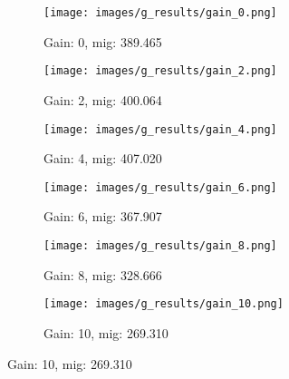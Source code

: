 \begin{figure}[h]
    \centering
    \begin{subfigure}[b]{0.4\textwidth}
        \centering
        \texttt{[image: images/g\_results/gain\_0.png]}
        \caption{Gain: 0, \gls{mig}: 389.465}
        \label{subfig:underexposed.png}
    \end{subfigure}
    \hspace{1cm}
    \begin{subfigure}[b]{0.4\textwidth}
        \centering
        \texttt{[image: images/g\_results/gain\_2.png]}
        \caption{Gain: 2, \gls{mig}: 400.064}
        \label{subfig:underexposed.png}
    \end{subfigure}

    \vspace{5mm}
    
    \begin{subfigure}[b]{0.4\textwidth}
        \centering
        \texttt{[image: images/g\_results/gain\_4.png]}
        \caption{Gain: 4, \gls{mig}: 407.020}
        \label{subfig:underexposed.png}
    \end{subfigure}
    \hspace{1cm}
    \begin{subfigure}[b]{0.4\textwidth}
        \centering
        \texttt{[image: images/g\_results/gain\_6.png]}
        \caption{Gain: 6, \gls{mig}: 367.907}
        \label{subfig:underexposed.png}
    \end{subfigure}

    \vspace{5mm}

    \begin{subfigure}[b]{0.4\textwidth}
        \centering
        \texttt{[image: images/g\_results/gain\_8.png]}
        \caption{Gain: 8, \gls{mig}: 328.666}
        \label{subfig:underexposed.png}
    \end{subfigure}
    \hspace{1cm}
    \begin{subfigure}[b]{0.4\textwidth}
        \centering
        \texttt{[image: images/g\_results/gain\_10.png]}
        \caption{Gain: 10, \gls{mig}: 269.310}
        \label{subfig:underexposed.png}
    \end{subfigure}

    \vspace{5mm}
    

\end{figure}
